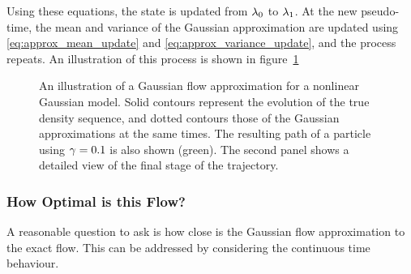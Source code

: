 \documentclass{article}
\begin{document}
Using these equations, the state is updated from $\lambda_0$ to $\lambda_1$. At the new pseudo-time, the mean and variance of the Gaussian approximation are updated using \eqref{eq:approx_mean_update} and \eqref{eq:approx_variance_update}, and the process repeats. An illustration of this process is shown in figure~\ref{approx_gaussian_flow_example}

\begin{figure}
\centering
\subfloat[]{  }
\subfloat[]{  }
\caption{An illustration of a Gaussian flow approximation for a nonlinear Gaussian model. Solid contours represent the evolution of the true density sequence, and dotted contours those of the Gaussian approximations at the same times. The resulting path of a particle using $\gamma=0.1$ is also shown (green). The second panel shows a detailed view of the final stage of the trajectory.}
\label{approx_gaussian_flow_example}
\end{figure}



\subsubsection{How Optimal is this Flow?}

A reasonable question to ask is how close is the Gaussian flow approximation to the exact flow. This can be addressed by considering the continuous time behaviour.
\end{document}
